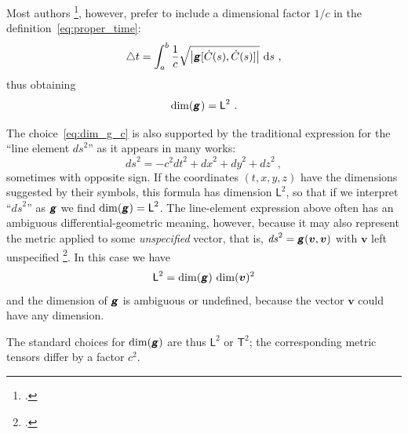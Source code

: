 \documentclass[\ifafour a4paper,12pt,\else a5paper,10pt,\fi%
onecolumn,oneside,article,%
british%
]{memoir}
\makeatletter
\theoremstyle{remark}
\theoremstyle{innote}
\newcommand*{\mathte}[1]{\textbf{\textit{\textsf{#1}}}}
\newcommand*{\citep}{\footcites}
\newcommand*{\di}{\mathrm{d}}%
\newcommand*{\incr}{\triangle}%
\DeclarePairedDelimiter\abs{\lvert}{\rvert}
\renewcommand*{\|}[1][]{\nonscript\,#1\vert\nonscript\;\mathopen{}}
\newcommand*{\sect}{\S}%
\newcommand*{\chap}{ch.}%
\newcommand*{\eqn}{eq.}%
\newcommand*{\eg}{{e.g.}}
\newcommand*{\cf}{{cf.}}
\newcommand*{\q}{}%
\DeclareRobustCommand*{\q}{%
  \mathord{\mathpalette\bigcdot@{}}%
}
\newcommand*{\bigcdot@scalefactor}{0.7}
\newcommand*{\bigcdot@widthfactor}{1.5}
\newcommand*{\bigcdot@}[2]{%
  \sbox0{$#1\vcenter{}$}%
  \sbox2{$#1\cdot\m@th$}%
  \hbox to \bigcdot@widthfactor\wd2{%
    \hfil
    \raise\ht0\hbox{%
      \scalebox{\bigcdot@scalefactor}{%
        \lower\ht0\hbox{$#1\bullet\m@th$}%
      }%
    }%
    \hfil
  }%
}
\newcommand*{\Le}{\textsf{L}}
\newcommand*{\Ti}{\textsf{T}}
\newcommand*{\yg}{\mathte{g}}
\newcommand*{\ygc}{\mathte{g}}
\newcommand*{\yv}{\bm{v}}
\renewcommand*{\i}{\indices}
\newcommand*{\ds}{\mathit{ds}}
\newcommand*{\inct}{\incr t}
\makeatother
\begin{document}
Most authors \citep[\eg][\sect~V.62 \eqn~(62.02)]{fock1955_t1964}[\chap~11
\eqn~(11.21)]{curtisetal1985}[\sect~5.3
\eqn~(5.6)]{rindler1969_r1986}[\chap~6 \eqn~(6.24)]{hartle2003}, however,
prefer to include a dimensional factor $1/c$ in the
definition~\eqref{eq:proper_time}:
\begin{equation}%
  \label{eq:proper_time_c}
  \inct = \int_a^b
  \frac{1}{c} \sqrt{\abs*{\ygc[\dot{C}(s),\dot{C}(s)]}} \ \di s\ ,
\end{equation}
thus obtaining
\begin{equation}%
  \label{eq:dim_g_c}
  \dim(\ygc\i{_{\q\q}}) = \Le^{2}\ .
\end{equation}

The choice~\eqref{eq:dim_g_c} is also supported by the traditional
expression for the \enquote{line element $\ds^{2}$} as it appears in many
works:
\begin{equation}
  \label{eq:line_elem}
  \ds^{2} = -c^2\mathit{dt}^2 + \mathit{dx}^2 +\mathit{dy}^2 + \mathit{dz}^2
  \ ,
\end{equation}
sometimes with opposite sign. If the coordinates $(t,x,y,z)$ have the
dimensions suggested by their symbols, this formula has dimension
$\Le^{2}$, so that if we interpret \enquote{$\ds^{2}$} as $\ygc$ we find
$\dim(\ygc) = \Le^{2}$. The line-element expression above often has an
ambiguous differential-geometric meaning, however, because it may also
represent the metric applied to some \emph{unspecified} vector, that is,
$\ds^{2} = \yg(\yv,\yv)$ with $\yv$ left unspecified \citep[\cf][Box~3.2~D
p.~77]{misneretal1970_r1973}. In this case we have
\begin{equation*}
  \label{eq:line_elem_dim_ambiguous}
  \Le^{2} = \dim(\yg)\,\dim(\yv)^{2}
\end{equation*}
and the dimension of $\yg$ is ambiguous or undefined, because the vector
$\yv$ could have any dimension.%

\medskip

The standard choices for $\dim(\yg)$ are thus $\Le^{2}$ or $\Ti^{2}$; the
corresponding metric tensors differ by a factor $c^{2}$.
\end{document}
